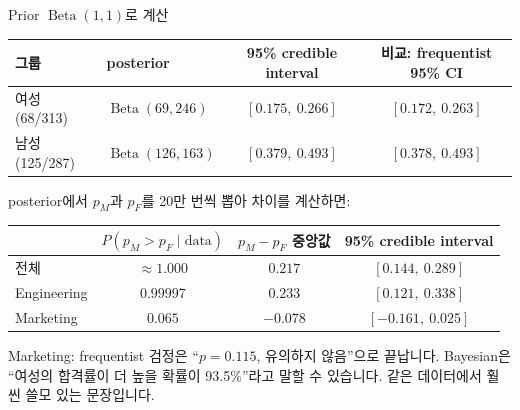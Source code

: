 \documentclass[11pt,a4paper]{article}
\newcommand{\BetaD}{\operatorname{Beta}}
\begin{document}
\begin{databox}{Prior $\BetaD(1,1)$로 계산}
\begin{center}
\begin{tabular}{@{}l l c c@{}}
\toprule
그룹 & posterior & 95\% credible interval & 비교: frequentist 95\% CI \\
\midrule
여성 (68/313) & $\BetaD(69,246)$ & $[0.175,\ 0.266]$ & $[0.172,\ 0.263]$ \\
남성 (125/287) & $\BetaD(126,163)$ & $[0.379,\ 0.493]$ & $[0.378,\ 0.493]$ \\
\bottomrule
\end{tabular}
\end{center}
posterior에서 $p_M$과 $p_F$를 20만 번씩 뽑아 차이를 계산하면:
\begin{center}
\begin{tabular}{@{}l c c c@{}}
\toprule
 & $P(p_M>p_F\mid\text{data})$ & $p_M-p_F$ 중앙값 & 95\% credible interval \\
\midrule
전체 & $\approx1.000$ & $0.217$ & $[0.144,\ 0.289]$ \\
Engineering & $0.99997$ & $0.233$ & $[0.121,\ 0.338]$ \\
Marketing & $0.065$ & $-0.078$ & $[-0.161,\ 0.025]$ \\
\bottomrule
\end{tabular}
\end{center}
Marketing: frequentist 검정은 ``$p=0.115$, 유의하지 않음''으로 끝납니다. Bayesian은 ``여성의 합격률이 더 높을 확률이 93.5\%''라고 말할 수 있습니다. 같은 데이터에서 훨씬 쓸모 있는 문장입니다.
\end{databox}
\end{document}
